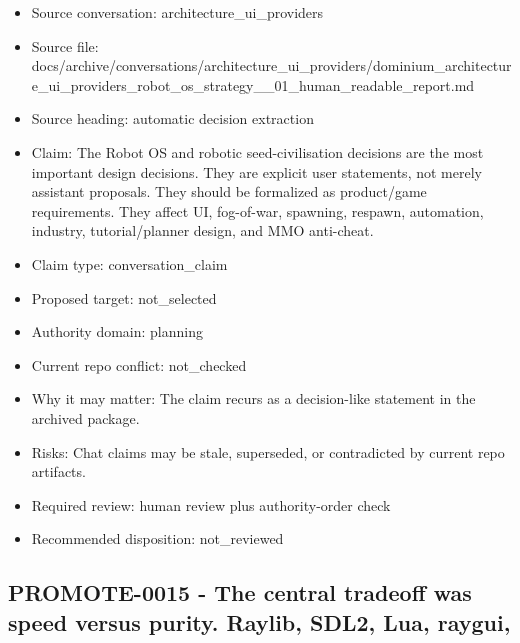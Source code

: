 \documentclass[11pt,a4paper]{report}
\begin{document}
\begin{itemize}
\item Source conversation: architecture\_ui\_providers
\item Source file: docs/archive/conversations/architecture\_ui\_providers/dominium\_architecture\_ui\_providers\_robot\_os\_strategy\_\_01\_human\_readable\_report.md
\item Source heading: automatic decision extraction
\item Claim: The Robot OS and robotic seed-civilisation decisions are the most important design decisions. They are explicit user statements, not merely assistant proposals. They should be formalized as product/game requirements. They affect UI, fog-of-war, spawning, respawn, automation, industry, tutorial/planner design, and MMO anti-cheat.
\item Claim type: conversation\_claim
\item Proposed target: not\_selected
\item Authority domain: planning
\item Current repo conflict: not\_checked
\item Why it may matter: The claim recurs as a decision-like statement in the archived package.
\item Risks: Chat claims may be stale, superseded, or contradicted by current repo artifacts.
\item Required review: human review plus authority-order check
\item Recommended disposition: not\_reviewed
\end{itemize}

\subsection{PROMOTE-0015 - The central tradeoff was speed versus purity. Raylib, SDL2, Lua, raygui,}
\end{document}
